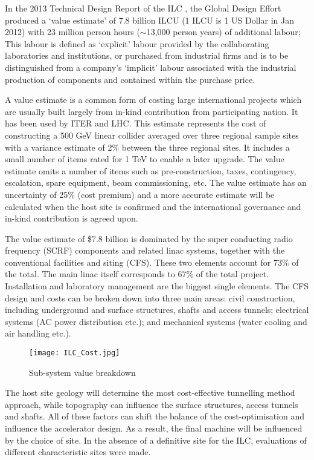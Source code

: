 In the 2013 Technical Design Report of the ILC \cite{ILC:TechnicalDesignReport}, the Global Design Effort produced a `value estimate' of 7.8 billion ILCU (1 ILCU is 1 US Dollar in Jan 2012) with 23 million person hours ($\sim$13,000 person years) of additional labour; This labour is defined as `explicit' labour provided by the collaborating laboratories and institutions, or purchased from industrial firms and is to be distinguished from a company's `implicit' labour associated with the industrial production of components and contained within the purchase price.  
 
A value estimate is a common form of costing large international projects which are usually built largely from in-kind contribution from participating nation. It has been used by ITER and LHC. This estimate represents the cost of constructing a 500 GeV linear collider averaged over three regional sample sites \textemdash \, with a variance estimate of 2\% between the three regional sites. It includes a small number of items rated for 1 TeV to enable a later upgrade. The value estimate omits a number of items such as pre-construction, taxes, contingency, escalation, spare equipment, beam commissioning, etc. The value estimate has an uncertainty of 25\% (cost premium) and a more accurate estimate will be calculated when the host site is confirmed and the international governance and in-kind contribution is agreed upon.
 
The value estimate of \$7.8 billion is dominated by the super conducting radio frequency (SCRF) components and related linac systems, together with the conventional facilities and siting (CFS). These two elements account for 73\% of the total. The main linac itself corresponds to 67\% of the total project. Installation and laboratory management are the biggest single elements. The CFS design and costs can be broken down into three main areas: civil construction, including underground and surface structures, shafts and access tunnels; electrical systems (AC power distribution etc.); and mechanical systems (water cooling and air handling etc.).
 
\begin{figure}[!htb]
\centering
\texttt{[image: ILC\_Cost.jpg]}
\caption{Sub-system value breakdown \cite{ILC:TechnicalDesignReport}}
\end{figure}
 
The host site geology will determine the most cost-effective tunnelling method approach, while topography can influence the surface structures, access tunnels and shafts. All of these factors can shift the balance of the cost-optimisation and influence the accelerator design. As a result, the final machine will be influenced by the choice of site. In the absence of a definitive site for the ILC, evaluations of different characteristic sites were made. \cite{ILC:TechnicalDesignReport}
 
